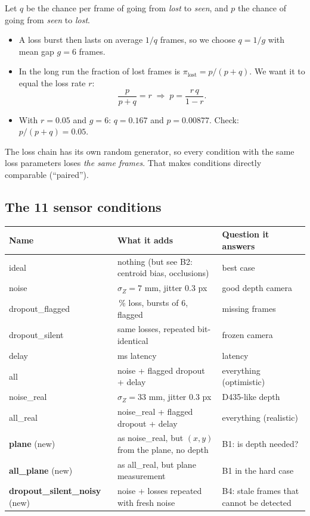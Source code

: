 \documentclass[11pt,a4paper]{article}
\begin{document}
\begin{idea}
Let $q$ be the chance per frame of going from \emph{lost} to \emph{seen}, and $p$ the chance of going from \emph{seen} to
\emph{lost}.
\begin{itemize}
\item A loss burst then lasts on average $1/q$ frames, so we choose $q=1/g$ with mean gap $g=6$ frames.
\item In the long run the fraction of lost frames is $\pi_{\text{lost}} = p/(p+q)$. We want it to equal the loss rate $r$:
\[ \frac{p}{p+q}=r \;\Rightarrow\; p = \frac{r\,q}{1-r}. \]
\item With $r=0.05$ and $g=6$: $q=0.167$ and $p=0.00877$. Check: $p/(p+q)=0.05$.
\end{itemize}
The loss chain has its own random generator, so every condition with the same loss parameters loses
\emph{the same frames}. That makes conditions directly comparable (``paired'').
\end{idea}

\subsection{The 11 sensor conditions}
\begin{center}\small
\begin{tabularx}{\linewidth}{@{}l>{\raggedright\arraybackslash}X>{\raggedright\arraybackslash}X@{}}\toprule
Name & What it adds & Question it answers\\\midrule
ideal & nothing (but see B2: centroid bias, occlusions) & best case\\
noise & $\sigma_Z=7$ mm, jitter 0.3 px & good depth camera\\
dropout\_flagged & 5\,\% loss, bursts of 6, flagged & missing frames\\
dropout\_silent & same losses, repeated bit-identical & frozen camera\\
delay & 40 ms latency & latency\\
all & noise + flagged dropout + delay & everything (optimistic)\\
noise\_real & $\sigma_Z=33$ mm, jitter 0.3 px & D435-like depth\\
all\_real & noise\_real + flagged dropout + delay & everything (realistic)\\\midrule
\textbf{plane} (new) & as noise\_real, but $(x,y)$ from the plane, no depth & B1: is depth needed?\\
\textbf{all\_plane} (new) & as all\_real, but plane measurement & B1 in the hard case\\
\textbf{dropout\_silent\_noisy} (new) & noise + losses repeated with fresh noise & B4: stale frames that cannot be detected\\\bottomrule
\end{tabularx}\end{center}
\end{document}
